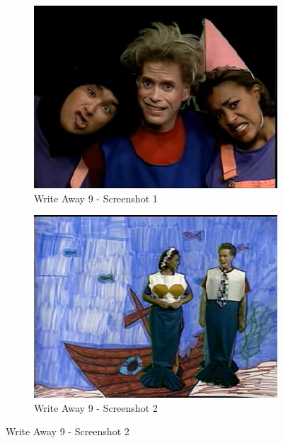 \begin{figure}[H]
    \centering
    \begin{subfigure}{0.45\textwidth}
        \centering
        \includegraphics[width=\linewidth]{Games/WriteAway/Images/WriteAway9Screenshot1.png}
        \caption{Write Away 9 - Screenshot 1}
    \end{subfigure}
    \begin{subfigure}{0.45\textwidth}
        \centering
        \includegraphics[width=\linewidth]{Games/WriteAway/Images/WriteAway9Screenshot2.png}
        \caption{Write Away 9 - Screenshot 2}
    \end{subfigure}


\end{figure}
